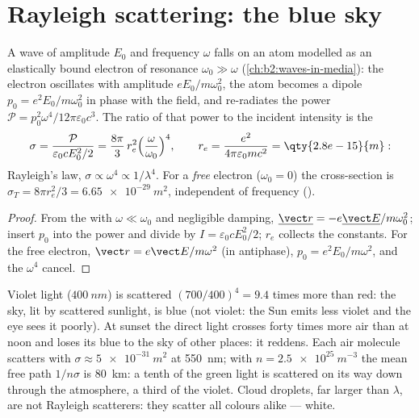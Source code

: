 \section{Rayleigh scattering: the blue sky}

\begin{proposition}\label{prop:b2:dipole-radiation:rayleigh}
A wave of amplitude $E_0$ and frequency $\omega$ falls on an atom modelled
as an elastically bound electron of resonance $\omega_0 \gg \omega$
(\cref{ch:b2:waves-in-media}): the electron oscillates with amplitude
$eE_0/m\omega_0^2$, the atom becomes a dipole $p_0 = e^2E_0/m\omega_0^2$ in phase
with the field, and re-radiates the power $\mathcal P = p_0^2\omega^4/12\pi
\varepsilon_0c^3$. The ratio of that power to the incident intensity is the
\emph{}
\[
\sigma = \frac{\mathcal P}{\varepsilon_0cE_0^2/2} = \frac{8\pi}3\,r_e^2\Bigl(\frac\omega{\omega_0}\Bigr)^4 ,
\qquad r_e = \frac{e^2}{4\pi\varepsilon_0mc^2} = \qty{2.8e-15}{m} :
\]
Rayleigh's law, $\sigma \propto \omega^4 \propto 1/\lambda^4$. For a \emph{free}
electron ($\omega_0 = 0$) the cross-section is $\sigma_T = 8\pi r_e^2/3 =
\qty{6.65e-29}{m^2}$, independent of frequency ().
\end{proposition}

\begin{proof}
From the  with $\omega \ll \omega_0$ and negligible damping,
$\underline{\vect r} = -e\underline{\vect E}/m\omega_0^2$; insert $p_0$ into the power and
divide by $I = \varepsilon_0cE_0^2/2$; $r_e$ collects the constants. For the free
electron, $\vect r = e\vect E/m\omega^2$ (in antiphase), $p_0 = e^2E_0/m\omega^2$, and
the $\omega^4$ cancel.
\end{proof}

\begin{example}\label{ex:b2:dipole-radiation:sky}
Violet light ($\qty{400}{nm}$) is scattered $(700/400)^4 = 9.4$ times more
than red: the sky, lit by scattered sunlight, is blue (not violet: the
Sun emits less violet and the eye sees it poorly). At sunset the direct
light crosses forty times more air than at noon and loses its blue to
the sky of other places: it reddens. Each air molecule scatters with
$\sigma \approx \qty{5e-31}{m^2}$ at \qty{550}{nm}; with $n = \qty{2.5e25}{m^{-3}}$ the
mean free path $1/n\sigma$ is \qty{80}{km}: a tenth of the green light is
scattered on its way down through the atmosphere, a third of the
violet. Cloud droplets, far larger than $\lambda$, are not Rayleigh
scatterers: they scatter all colours alike --- white.
\end{example}

